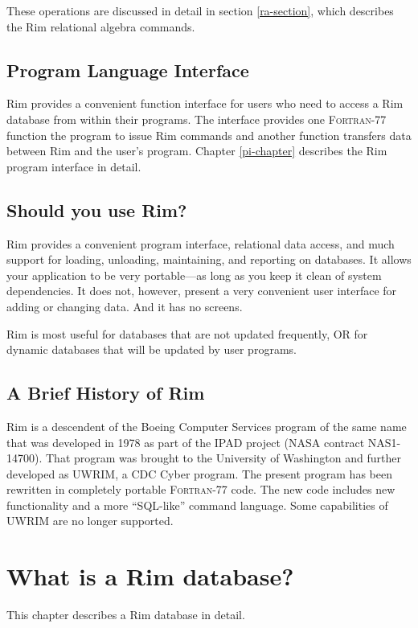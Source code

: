 \documentclass[11pt,a4paper]{report}
\def\I{\index}
\begin{document}
These operations are discussed in detail in section
\ref{ra-section}, which describes the Rim relational
algebra commands.
 
 
\section{Program Language Interface}
\I{Fortran}
Rim provides a convenient function interface
for users who need to access a Rim database from
within their programs.  The interface provides one \textsc{Fortran-77} function
the program to issue Rim commands and another
function transfers data between Rim and the user's program.
Chapter \ref{pi-chapter} describes the Rim program interface
in detail.
 
\section{Should you use Rim?}
Rim provides a convenient program interface,
relational data access,
and much support for loading, unloading,
maintaining, and reporting on databases.  
It allows your application to be very
portable---as long as you keep it clean of system dependencies.
It does not, however, present
a very convenient user interface for adding or changing data.
And it has no screens.  

Rim is most useful for databases that are not updated frequently,
OR for dynamic databases that will be updated by user programs.

\section{A Brief History of Rim}
Rim is a descendent of the Boeing Computer Services\I{Boeing} program
of the same name that was developed in 1978 as part of the IPAD project
(NASA contract NAS1-14700)\I{NASA}.
That program was brought
to the University of Washington and further developed
as UWRIM\I{UWRIM}, a CDC Cyber program.
The present program has been rewritten in completely portable
\textsc{Fortran-77} code.  The new code includes new functionality
and a more ``SQL-like'' command language.
Some capabilities of UWRIM are no longer supported.
 
%
%
\chapter{What is a Rim database?}
 
 
This chapter describes a Rim database in detail.
 
\end{document}
